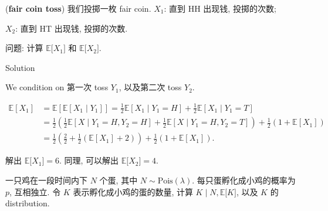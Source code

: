 \documentclass{qlnotes-export}
\begin{document}
\begin{example}\label{ex-03-joint-conditional-distribution-example-008}

(\textbf{fair coin toss}) 我们投掷一枚 fair coin. \(X_{1}\): 直到 HH 出现钱, 投掷的次数;

\(X_{2}\): 直到 HT 出现钱, 投掷的次数.

问题: 计算 \({\mathbb{E}}\lbrack X_{1}\rbrack\) 和 \({\mathbb{E}}\lbrack X_{2}\rbrack\).

\end{example}

\begin{qlsolution}{Solution}

We condition on 第一次 toss \(Y_{1}\), 以及第二次 toss \(Y_{2}\).

\[\begin{matrix}
{{\mathbb{E}}\left\lbrack X_{1} \right\rbrack} & {= {\mathbb{E}}\left\lbrack {{\mathbb{E}}\left\lbrack {X_{1} \mid Y_{1}} \right\rbrack} \right\rbrack = \frac{1}{2}{\mathbb{E}}\left\lbrack {X_{1} \mid Y_{1} = H} \right\rbrack + \frac{1}{2}{\mathbb{E}}\left\lbrack {X_{1} \mid Y_{1} = T} \right\rbrack} \\
 & {= \frac{1}{2}\left( {\frac{1}{2}{\mathbb{E}}\left\lbrack {X \mid Y_{1} = H,Y_{2} = H} \right\rbrack + \frac{1}{2}{\mathbb{E}}\left\lbrack {X \mid Y_{1} = H,Y_{2} = T} \right\rbrack} \right) + \frac{1}{2}\left( {1 + {\mathbb{E}}\left\lbrack X_{1} \right\rbrack} \right)} \\
 & {= \frac{1}{2}\left( {\frac{2}{2} + \frac{1}{2}\left( {{\mathbb{E}}\left\lbrack X_{1} \right\rbrack + 2} \right)} \right) + \frac{1}{2}\left( {1 + {\mathbb{E}}\left\lbrack X_{1} \right\rbrack} \right).}
\end{matrix}\]

解出 \({\mathbb{E}}\lbrack X_{1}\rbrack = 6\). 同理, 可以解出 \({\mathbb{E}}\lbrack X_{2}\rbrack = 4\).

\end{qlsolution}

\begin{example}\label{ex-03-joint-conditional-distribution-example-009}

一只鸡在一段时间内下 \(N\) 个蛋, 其中 \(N \sim \text{Pois}(\lambda)\). 每只蛋孵化成小鸡的概率为 \(p\), 互相独立. 令 \(K\) 表示孵化成小鸡的蛋的数量, 计算 \(\left. K \middle| N,{\mathbb{E}}\lbrack K\rbrack \right.\), 以及 \(K\) 的 distribution.

\end{example}
\end{document}
